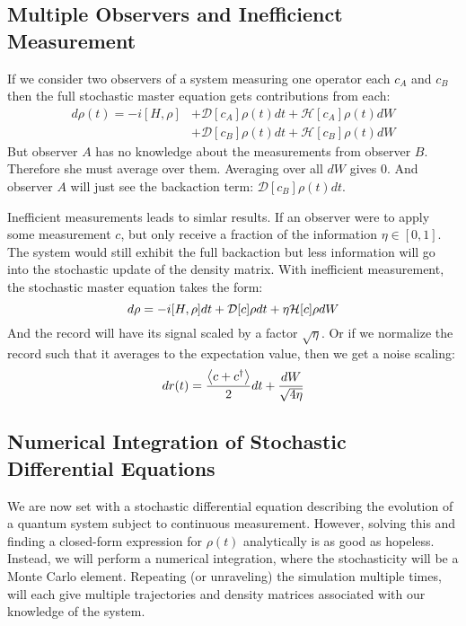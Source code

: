 \subsection{Multiple Observers and Inefficienct Measurement}\label{sec:sme_inefficient}
If we consider two observers of a system measuring one operator each $c_A$ and $c_B$ then the full stochastic master equation gets contributions from each:
\begin{align*}
    d\rho(t) = -i[H, \rho] &+ \mathcal{D}[c_A]\rho(t) dt + \mathcal{H}[c_A]\rho(t) dW \\
                           &+ \mathcal{D}[c_B]\rho(t) dt + \mathcal{H}[c_B]\rho(t) dW
\end{align*}
But observer $A$ has no knowledge about the measurements from observer $B$. Therefore she must average over them. Averaging over all $dW$ gives $0$. And observer $A$ will just see the backaction term: $\mathcal{D}[c_B] \rho(t) dt$. 

Inefficient measurements leads to simlar results. If an observer were to apply some measurement $c$, but only receive a fraction of the information $\eta\in[0, 1]$. The system would still exhibit the full backaction but less information will go into the stochastic update of the density matrix. With inefficient measurement, the stochastic master equation takes the form:
\begin{equation}
    d\rho = -i \comm{H}{\rho}dt + \mathcal{D}[c]\rho dt + \eta \mathcal{H}[c] \rho dW
\end{equation}
And the record will have its signal scaled by a factor $\sqrt{\eta}$. Or if we normalize the record such that it averages to the expectation value, then we get a noise scaling:
\begin{equation}
    dr(t) = \frac{\expval{c + c^\dagger}}{2}dt + \frac{dW}{\sqrt{4\eta}}
\end{equation}

\subsection{Numerical Integration of Stochastic Differential Equations}
We are now set with a stochastic differential equation describing the evolution of a quantum system subject to continuous measurement. However, solving this and finding a closed-form expression for $\rho(t)$ analytically is as good as hopeless. Instead, we will perform a numerical integration, where the stochasticity will be a Monte Carlo element. Repeating (or unraveling) the simulation multiple times, will each give multiple trajectories and density matrices associated with our knowledge of the system. 

